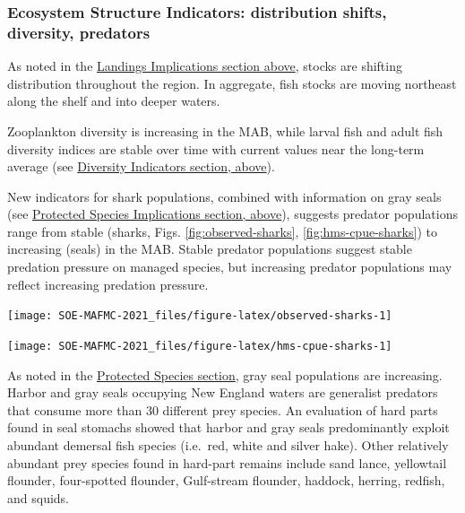 \documentclass[
  10pt,
]{article}
\let\origfigure\figure
\let\endorigfigure\endfigure
\renewenvironment{figure}[1][2] {
    \expandafter\origfigure\expandafter[H]
} {
    \endorigfigure
}
\begin{document}
\hypertarget{ecosystem-structure-indicators-distribution-shifts-diversity-predators}{%
\subsubsection{Ecosystem Structure Indicators: distribution shifts,
diversity,
predators}\label{ecosystem-structure-indicators-distribution-shifts-diversity-predators}}

As noted in the \protect\hyperlink{landings}{Landings Implications
section above}, stocks are shifting distribution throughout the region.
In aggregate, fish stocks are moving northeast along the shelf and into
deeper waters.

Zooplankton diversity is increasing in the MAB, while larval fish and
adult fish diversity indices are stable over time with current values
near the long-term average (see \protect\hyperlink{diversity}{Diversity
Indicators section, above}).

New indicators for shark populations, combined with information on gray
seals (see \protect\hyperlink{protected-species}{Protected Species
Implications section, above}), suggests predator populations range from
stable (sharks, Figs. \ref{fig:observed-sharks},
\ref{fig:hms-cpue-sharks}) to increasing (seals) in the MAB. Stable
predator populations suggest stable predation pressure on managed
species, but increasing predator populations may reflect increasing
predation pressure.

\begin{figure}

{\centering \texttt{[image: SOE-MAFMC-2021\_files/figure-latex/observed-sharks-1]} 

}

\caption{Estimated number of sharks per unit effort from Northeast Fisheries Observer Program data.}\label{fig:observed-sharks}
\end{figure}

\begin{figure}

{\centering \texttt{[image: SOE-MAFMC-2021\_files/figure-latex/hms-cpue-sharks-1]} 

}

\caption{Estimated number of sharks per unit effort from Highly Migratory Species Pelagic Observer Program data.}\label{fig:hms-cpue-sharks}
\end{figure}

As noted in the \protect\hyperlink{protected-species}{Protected Species
section}, gray seal populations are increasing. Harbor and gray seals
occupying New England waters are generalist predators that consume more
than 30 different prey species. An evaluation of hard parts found in
seal stomachs showed that harbor and gray seals predominantly exploit
abundant demersal fish species (i.e.~red, white and silver hake). Other
relatively abundant prey species found in hard-part remains include sand
lance, yellowtail flounder, four-spotted flounder, Gulf-stream flounder,
haddock, herring, redfish, and squids.
\end{document}
